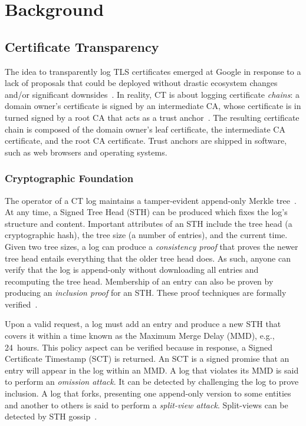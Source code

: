 \section{Background} \label{sec:background}

\subsection{Certificate Transparency} \label{sec:background:ct}
The idea to transparently log TLS certificates emerged at Google in response to
a lack of proposals that could be deployed without drastic ecosystem changes
and/or significant downsides~\cite{ct/a}.  In reality, CT is about logging
certificate \emph{chains}:
	a domain owner's certificate is signed by an intermediate CA, whose
	certificate is in turned signed by a root CA that acts as a trust
	anchor~\cite{ca-ecosystem}.
The resulting certificate chain is composed of the domain owner's leaf
certificate, the intermediate CA certificate, and the root CA certificate.
Trust anchors are shipped in software, such as web browsers and operating
systems.

\subsubsection{Cryptographic Foundation}
The operator of a CT log maintains a tamper-evident append-only Merkle
tree~\cite{ct,ct/bis}.  At any time, a Signed Tree Head (STH) can be produced
which fixes the log's structure and content.  Important attributes of an STH
include
	the tree head (a cryptographic hash),
	the tree size (a number of entries), and
	the current time.
Given two tree sizes, a log can produce a \emph{consistency proof} that proves
the newer tree head entails everything that the older tree head does.  As such,
anyone can verify that the log is append-only without downloading all entries
and recomputing the tree head.  Membership of an entry can also be proven
by producing an \emph{inclusion proof} for an STH\@.  These proof techniques are
formally verified~\cite{secure-logging-and-ct}.

Upon a valid request, a log must add an entry and produce a new STH that covers
it within a time known as the Maximum Merge Delay (MMD), e.g., 24~hours.  This
policy aspect can be verified because in response, a Signed Certificate
Timestamp (SCT) is returned.  An SCT is a signed promise that an entry will
appear in the log within an MMD.  A log that violates its MMD is said to perform
an \emph{omission attack}.  It can be detected by challenging the log to prove
inclusion.  A log that forks, presenting one append-only version
to some entities and another to others is said to perform a \emph{split-view
attack}.  Split-views can be detected by STH
gossip~\cite{chuat,dahlberg,nordberg,syta}.

